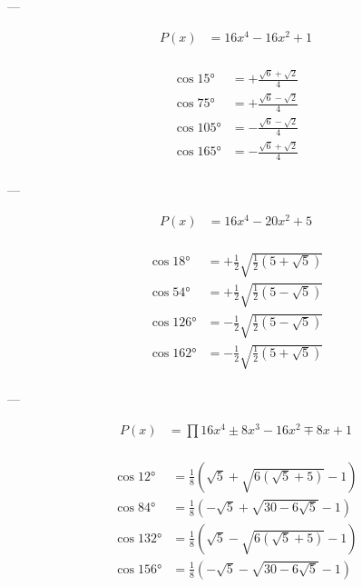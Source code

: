 ---

$$
\begin{aligned}
    P(x) &= 16 x^4-16 x^2+1\\
\end{aligned}
$$

$$
\begin{aligned}
    \cos 15°  &= +\frac{\sqrt{6}+\sqrt{2}}{4}\\
    \cos 75°  &= +\frac{\sqrt{6}-\sqrt{2}}{4}\\
    \cos 105° &= -\frac{\sqrt{6}-\sqrt{2}}{4}\\
    \cos 165° &= -\frac{\sqrt{6}+\sqrt{2}}{4}\\
\end{aligned}
$$

---

$$
\begin{aligned}
    P(x) &= 16 x^4-20 x^2+5\\
\end{aligned}
$$

$$
\begin{aligned}
    \cos 18°  &= +\frac{1}{2} \sqrt{\frac{1}{2} \left(5+\sqrt{5}\right)}\\
    \cos 54°  &= +\frac{1}{2} \sqrt{\frac{1}{2} \left(5-\sqrt{5}\right)}\\
    \cos 126° &= -\frac{1}{2} \sqrt{\frac{1}{2} \left(5-\sqrt{5}\right)}\\
    \cos 162° &= -\frac{1}{2} \sqrt{\frac{1}{2} \left(5+\sqrt{5}\right)}\\
\end{aligned}
$$

---

$$
\begin{aligned}
    P(x) &= \prod 16 x^4±8 x^3-16 x^2∓8 x+1\\
\end{aligned}
$$

$$
\begin{aligned}
    \cos 12°  &= \frac{1}{8} \left(\sqrt{5}+\sqrt{6 \left(\sqrt{5}+5\right)}-1\right)\\
    \cos 84°  &= \frac{1}{8} \left(-\sqrt{5}+\sqrt{30-6 \sqrt{5}}-1\right)\\
    \cos 132° &= \frac{1}{8} \left(\sqrt{5}-\sqrt{6 \left(\sqrt{5}+5\right)}-1\right)\\
    \cos 156° &= \frac{1}{8} \left(-\sqrt{5}-\sqrt{30-6 \sqrt{5}}-1\right)\\
\end{aligned}
$$
